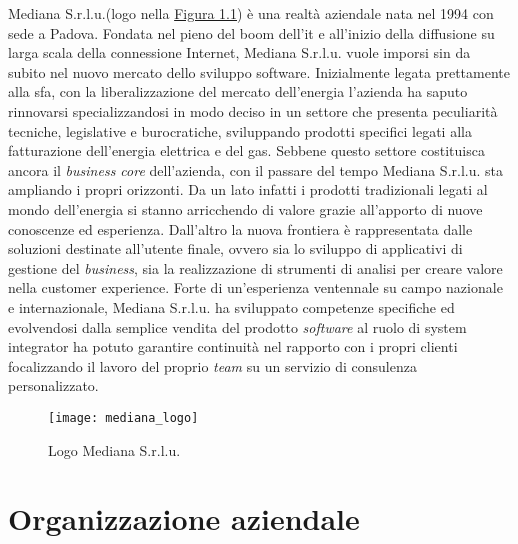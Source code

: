 Mediana S.r.l.u.(logo nella \hyperref[logoMediana]{Figura 1.1}) è una realtà aziendale nata nel 1994 con sede a Padova. Fondata nel pieno del boom dell'\acrshort{it} e all'inizio della diffusione su larga scala della connessione Internet, Mediana S.r.l.u. vuole imporsi sin da subito nel nuovo mercato dello sviluppo software. Inizialmente legata prettamente alla \acrshort{sfa}, con la liberalizzazione del mercato dell'energia l'azienda ha saputo rinnovarsi specializzandosi in modo deciso in un settore che presenta peculiarità tecniche, legislative e burocratiche, sviluppando prodotti specifici legati alla fatturazione dell'energia elettrica e del gas. Sebbene questo settore costituisca ancora il \textit{business core} dell'azienda, con il passare del tempo Mediana S.r.l.u. sta ampliando i propri orizzonti. Da un lato infatti i prodotti tradizionali legati al mondo dell'energia si stanno arricchendo di valore grazie all'apporto di nuove conoscenze ed esperienza. Dall'altro la nuova frontiera è rappresentata dalle soluzioni destinate all'utente finale, ovvero sia lo sviluppo di applicativi di gestione del \textit{business}, sia la realizzazione di strumenti di analisi per creare valore nella \gls{customer experience}. Forte di un'esperienza ventennale su campo nazionale e internazionale, Mediana S.r.l.u. ha sviluppato competenze specifiche ed evolvendosi dalla semplice vendita del prodotto \textit{software} al ruolo di \gls{system integrator} ha potuto garantire continuità nel rapporto con i propri clienti focalizzando il lavoro del proprio \textit{team} su un servizio di consulenza personalizzato.

\begin{figure}[ht]
\begin{center}
\texttt{[image: mediana\_logo]}
\caption{Logo Mediana S.r.l.u.}
\label{logoMediana}
\end{center}
\end{figure}

\clearpage
\section{Organizzazione aziendale}
\label{organizzazione}

